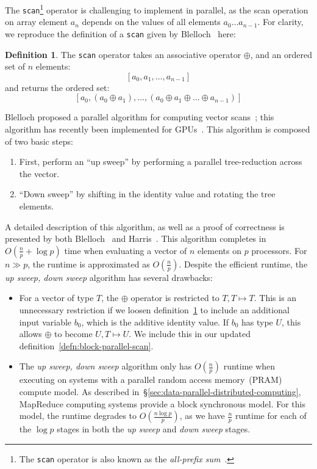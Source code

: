 \documentclass[preprint]{sigplanconf}
\theoremstyle{definition}
\newtheorem{defn}{Definition}
\begin{document}
The \texttt{scan}\footnote{The \texttt{scan} operator is also known as the \emph{all-prefix
sum}~\cite{blelloch93}.} operator is challenging to implement in parallel, as the scan operation on array
element $a_n$ depends on the values of all elements $a_0 \ldots a_{n - 1}$. For clarity, we
reproduce the definition of a \texttt{scan} given by Blelloch~\cite{blelloch93} here:

\begin{defn}
\label{defn:scan}
The \texttt{scan} operator takes an associative operator $\oplus$, and an ordered set of $n$ elements:
$$
[a_0, a_1, \ldots, a_{n - 1}]
$$
and returns the ordered set:
$$
[a_0, (a_0 \oplus a_1), \ldots, (a_0 \oplus a_1 \oplus \ldots \oplus a_{n - 1})]
$$
\end{defn}

Blelloch proposed a parallel algorithm for computing vector scans~\cite{blelloch93}; this algorithm has
recently been implemented for GPUs~\cite{harris07}. This algorithm is composed of two basic steps:

\begin{enumerate}
\item First, perform an ``up sweep'' by performing a parallel tree-reduction across the vector.
\item ``Down sweep'' by shifting in the identity value and rotating the tree elements.
\end{enumerate}

A detailed description of this algorithm, as well as a proof of correctness is presented by both
Blelloch~\cite{blelloch93} and Harris~\cite{harris07}. This algorithm completes in $O(\frac{n}{p} +
\log p)$ time when evaluating a vector of $n$ elements on $p$ processors. For $n \gg p$, the
runtime is approximated as $O(\frac{n}{p})$. Despite the efficient runtime, the \emph{up sweep,
down sweep} algorithm has several drawbacks:

\begin{itemize}
\item For a vector of type $T$, the $\oplus$ operator is restricted to $T, T \mapsto T$. This is an
unnecessary restriction if we loosen definition~\ref{defn:scan} to include an additional input variable
$b_0$, which is the additive identity value. If $b_0$ has type $U$, this allows $\oplus$ to become $U, T
\mapsto U$. We include this in our updated definition~\ref{defn:block-parallel-scan}.
\item The \emph{up sweep, down sweep} algorithm only has $O(\frac{n}{p})$ runtime when executing
on systems with a parallel random access memory~(PRAM) compute model. As described
in~\S\ref{sec:data-parallel-distributed-computing}, MapReduce computing systems provide a block
synchronous model. For this model, the runtime degrades to $O(\frac{n \log p}{p})$, as we have
$\frac{n}{p}$ runtime for each of the $\log p$ stages in both the \emph{up sweep} and \emph{down
sweep} stages.
\end{itemize}
\end{document}

